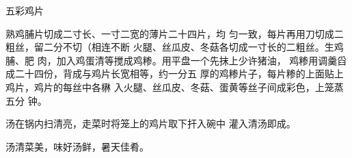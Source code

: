 \begin{recipe}{五彩鸡片}

\ingredients


\cooking

\step 熟鸡脯片切成二寸长、一寸二宽的薄片二十四片，均 匀一致，每片再用刀切成二粗丝，留二分不切（相连不断 火腿、丝瓜皮、冬菇各切成一寸长的二粗丝。生鸡脯、肥 肉，加入鸡蛋清等搅成鸡糁。用平盘一个先抹上少许猪油， 鸡糁用调羹舀成二十四份，背成与鸡片长宽相等，约一分五 厚的鸡糁片子，每片糁的上面贴上鸡片，鸡片的每丝中各楙 入火腿、丝瓜皮、冬菇、蛋黄等丝子间成彩色，上笼蒸五分 钟。

汤在锅内扫清亮，走菜时将笼上的鸡片取下扞入碗中 灌入清汤即成。

\notes

汤清菜美，味好汤鲜，暑天佳肴。

\end{recipe}

